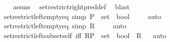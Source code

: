 \begin{isabellebody}
%
\isadelimproof
\ \ %
\endisadelimproof
%
\isatagproof
{}\isamarkupfalse%
\ assms\ \isamarkupfalse%
\ set{\isacharunderscore}{\kern0pt}restrict{\isacharunderscore}{\kern0pt}right{\isacharunderscore}{\kern0pt}pred{\isacharunderscore}{\kern0pt}def\ \isamarkupfalse%
\ blast%
\endisatagproof
{\isafoldproof}%
%
\isadelimproof
\isanewline
%
\endisadelimproof
\isanewline
{}\isamarkupfalse%
\ set{\isacharunderscore}{\kern0pt}restrict{\isacharunderscore}{\kern0pt}left{\isacharunderscore}{\kern0pt}empty{\isacharunderscore}{\kern0pt}eq\ {\isacharbrackleft}{\kern0pt}simp{\isacharbrackright}{\kern0pt}{\isacharcolon}{\kern0pt}\ {\isachardoublequoteopen}{\isacharbraceleft}{\kern0pt}{\isacharbraceright}{\kern0pt}{\isasymrestriction}\isactrlbsub P\ {\isacharcolon}{\kern0pt}{\isacharcolon}{\kern0pt}\ set\ {\isasymRightarrow}\ bool\isactrlesub \ {\isacharequal}{\kern0pt}\ {\isacharbraceleft}{\kern0pt}{\isacharbraceright}{\kern0pt}{\isachardoublequoteclose}%
\isadelimproof
\ %
\endisadelimproof
%
\isatagproof
{}\isamarkupfalse%
\ auto%
\endisatagproof
{\isafoldproof}%
%
\isadelimproof
%
\endisadelimproof
\isanewline
\isanewline
{}\isamarkupfalse%
\ set{\isacharunderscore}{\kern0pt}restrict{\isacharunderscore}{\kern0pt}left{\isacharunderscore}{\kern0pt}empty{\isacharunderscore}{\kern0pt}eq{\isacharprime}{\kern0pt}\ {\isacharbrackleft}{\kern0pt}simp{\isacharbrackright}{\kern0pt}{\isacharcolon}{\kern0pt}\ {\isachardoublequoteopen}R{\isasymrestriction}\isactrlbsub {\isacharbraceleft}{\kern0pt}{\isacharbraceright}{\kern0pt}\isactrlesub \ {\isacharequal}{\kern0pt}\ {\isacharbraceleft}{\kern0pt}{\isacharbraceright}{\kern0pt}{\isachardoublequoteclose}%
\isadelimproof
\ %
\endisadelimproof
%
\isatagproof
{}\isamarkupfalse%
\ auto%
\endisatagproof
{\isafoldproof}%
%
\isadelimproof
%
\endisadelimproof
\isanewline
\isanewline
{}\isamarkupfalse%
\ set{\isacharunderscore}{\kern0pt}restrict{\isacharunderscore}{\kern0pt}left{\isacharunderscore}{\kern0pt}subset{\isacharunderscore}{\kern0pt}self\ {\isacharbrackleft}{\kern0pt}iff{\isacharbrackright}{\kern0pt}{\isacharcolon}{\kern0pt}\ {\isachardoublequoteopen}R{\isasymrestriction}\isactrlbsub P\ {\isacharcolon}{\kern0pt}{\isacharcolon}{\kern0pt}\ set\ {\isasymRightarrow}\ bool\isactrlesub \ {\isasymsubseteq}\ R{\isachardoublequoteclose}%
\isadelimproof
\ %
\endisadelimproof
%
\isatagproof
{}\isamarkupfalse%
\ auto%
\endisatagproof
{\isafoldproof}%
%
\isadelimproof
%
\endisadelimproof
\isanewline
\isanewline

\end{isabellebody}
